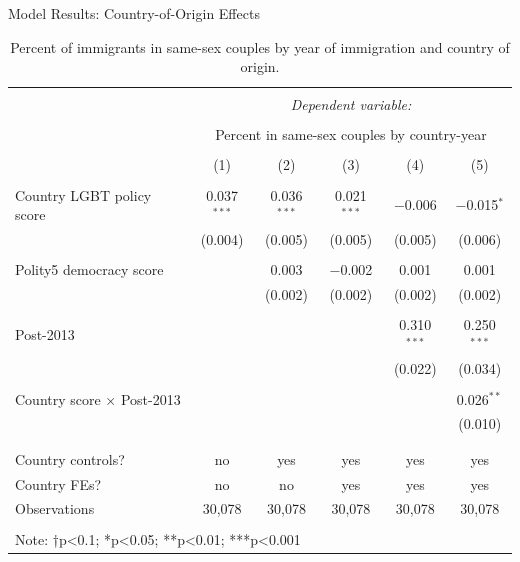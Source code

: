 \documentclass[
  ignorenonframetext,
]{beamer}
\begin{document}
\begin{frame}{Model Results: Country-of-Origin Effects}
\protect\hypertarget{model-results-country-of-origin-effects}{}
\begin{table}[!htbp] \centering 
  \caption{Percent of immigrants in same-sex couples by year of immigration and country of origin.} 
  \label{tab:country-props} 
\tiny 
\begin{tabular}{@{\extracolsep{3pt}}lccccc} 
\\[-1.8ex]\hline 
\hline \\[-1.8ex] 
 & \multicolumn{5}{c}{\textit{Dependent variable:}} \\ 
\cline{2-6} 
\\[-1.8ex] & \multicolumn{5}{c}{Percent in same-sex couples by country-year} \\ 
\\[-1.8ex] & (1) & (2) & (3) & (4) & (5)\\ 
\hline \\[-1.8ex] 
 Country LGBT policy score & 0.037$^{***}$ & 0.036$^{***}$ & 0.021$^{***}$ & $-$0.006 & $-$0.015$^{*}$ \\ 
  & (0.004) & (0.005) & (0.005) & (0.005) & (0.006) \\ 
  & & & & & \\ 
 Polity5 democracy score &  & 0.003 & $-$0.002 & 0.001 & 0.001 \\ 
  &  & (0.002) & (0.002) & (0.002) & (0.002) \\ 
  & & & & & \\ 
 Post-2013 &  &  &  & 0.310$^{***}$ & 0.250$^{***}$ \\ 
  &  &  &  & (0.022) & (0.034) \\ 
  & & & & & \\ 
 Country score × Post-2013 &  &  &  &  & 0.026$^{**}$ \\ 
  &  &  &  &  & (0.010) \\ 
  & & & & & \\ 
\hline \\[-1.8ex] 
Country controls? & no & yes & yes & yes & yes \\ 
Country FEs? & no & no & yes & yes & yes \\ 
Observations & 30,078 & 30,078 & 30,078 & 30,078 & 30,078 \\ 
\hline 
\hline \\[-1.8ex] 
\multicolumn{6}{l}{Note: †p<0.1; *p<0.05; **p<0.01; ***p<0.001} \\ 
\end{tabular} 
\end{table}
\end{frame}
\end{document}
